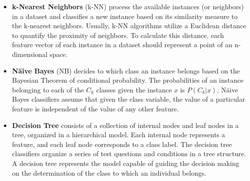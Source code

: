 \begin{itemize}
  \item \textbf{k-Nearest Neighbors} (k-NN) process the available instances (or neighbors) in a dataset and classifies a new instance based on its similarity measure to the k-nearest neighbors. Usually, k-NN algorithms utilize a Euclidean distance to quantify the proximity of neighbors. To calculate this distance, each feature vector of each instance in a dataset should represent a point of an n-dimensional space.
  
  \item \textbf{Näive Bayes} (NB) decides to which class an instance belongs based on the Bayesian Theorem of conditional probability. The probabilities of an instance belonging to each of the $C_{k}$ classes given the instance $x$ is $P(C_{k}|x )$. Näive Bayes classifiers assume that given the class variable, the value of a particular feature is independent of the value of any other feature.
  
  \item \textbf{Decision Tree} consists of a collection of internal nodes and leaf nodes in a tree, organized in a hierarchical model.  Each internal node represents a feature, and each leaf node corresponds to a class label. The decision tree classifiers organize a series of test questions and conditions in a tree structure.  A decision tree represents the model capable of guiding the decision making on the determination of the class to which an individual belongs.
  

\end{itemize}
